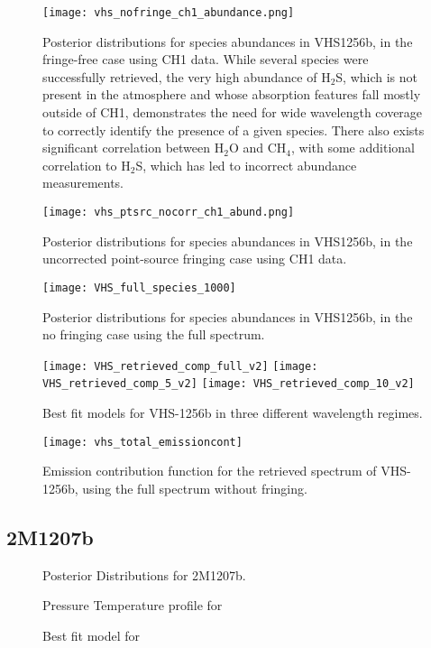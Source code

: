 \begin{figure}[t]
	\centering
	\texttt{[image: vhs\_nofringe\_ch1\_abundance.png]}
	\caption{Posterior distributions for species abundances in VHS1256b, in the fringe-free case using CH1 data. While several species were successfully retrieved, the very high abundance of H$_{2}$S, which is not present in the atmosphere and whose absorption features fall mostly outside of CH1, demonstrates the need for wide wavelength coverage to correctly identify the presence of a given species. There also exists significant correlation between H$_{2}$O and CH$_{4}$, with some additional correlation to H$_{2}$S, which has led to incorrect abundance measurements.}
	\label{fig:postVHS_abundances}
\end{figure}
\begin{figure}
	\centering
	\texttt{[image: vhs\_ptsrc\_nocorr\_ch1\_abund.png]}
	\caption{Posterior distributions for species abundances in VHS1256b, in the uncorrected point-source fringing case using CH1 data.}
	\label{fig:postVHS_abundances_fringe}
\end{figure}
\begin{figure}
	\centering
	\texttt{[image: VHS\_full\_species\_1000]}
	\caption{Posterior distributions for species abundances in VHS1256b, in the no fringing case using the full spectrum. }
	\label{fig:postVHS_abundances_full}
\end{figure}

\begin{figure}[h]
	\centering
	\texttt{[image: VHS\_retrieved\_comp\_full\_v2]}
	\texttt{[image: VHS\_retrieved\_comp\_5\_v2]}
	\texttt{[image: VHS\_retrieved\_comp\_10\_v2]}
	\caption{Best fit models for VHS-1256b in three different wavelength regimes.}
	\label{fig:bestfitVHS}
\end{figure}
\begin{figure}[h]
	\texttt{[image: vhs\_total\_emissioncont]}
	\caption{Emission contribution function for the retrieved spectrum of VHS-1256b, using the full spectrum without fringing.}
	\label{fig:VHSemcont}
\end{figure}
\clearpage
\subsection{2M1207b}
\begin{figure}[h]
	\caption{Posterior Distributions for 2M1207b.}
	\label{fig:post2M}
\end{figure}
\begin{figure}[h]
	\caption{Pressure Temperature profile for}
	\label{fig:pres2M}
\end{figure}
\begin{figure}[h]
	\caption{Best fit model for}
	\label{fig:bestfit2M}
\end{figure}
\clearpage
